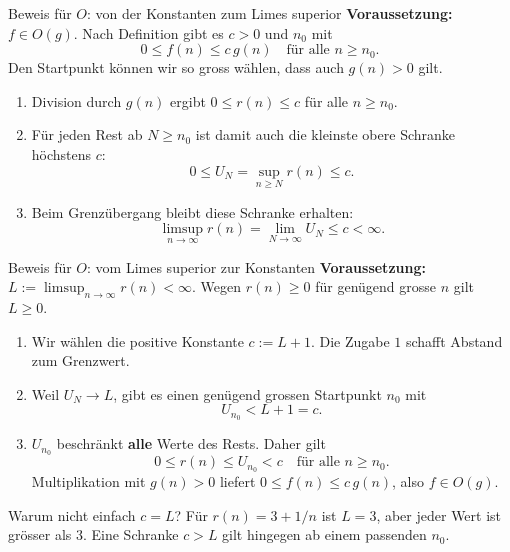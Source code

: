 \begin{frame}{Beweis für $O$: von der Konstanten zum Limes superior}
	\textbf{Voraussetzung:} $f\in O(g)$. Nach Definition gibt es $c>0$ und $n_0$ mit
	\[
		0\leq f(n)\leq c\,g(n)\quad\text{für alle }n\geq n_0.
	\]
	Den Startpunkt können wir so gross wählen, dass auch $g(n)>0$ gilt.
	\pause
	\begin{enumerate}
		\item Division durch $g(n)$ ergibt $0\leq r(n)\leq c$ für alle $n\geq n_0$.
		\item Für jeden Rest ab $N\geq n_0$ ist damit auch die kleinste obere Schranke höchstens $c$:
		\[
			0\leq U_N=\sup_{n\geq N}r(n)\leq c.
		\]
		\item Beim Grenzübergang bleibt diese Schranke erhalten:
		\[
			\limsup_{n\to\infty}r(n)=\lim_{N\to\infty}U_N\leq c<\infty.
		\]
	\end{enumerate}
\end{frame}

\begin{frame}{Beweis für $O$: vom Limes superior zur Konstanten}
	\textbf{Voraussetzung:} $L:=\limsup_{n\to\infty}r(n)<\infty$.
	Wegen $r(n)\geq 0$ für genügend grosse $n$ gilt $L\geq 0$.
	\pause
	\begin{enumerate}
		\item Wir wählen die positive Konstante $c:=L+1$. Die Zugabe $1$ schafft Abstand zum Grenzwert.
		\item Weil $U_N\to L$, gibt es einen genügend grossen Startpunkt $n_0$ mit
		\[
			U_{n_0}<L+1=c.
		\]
		\item $U_{n_0}$ beschränkt \textbf{alle} Werte des Rests. Daher gilt
		\[
			0\leq r(n)\leq U_{n_0}<c\quad\text{für alle }n\geq n_0.
		\]
		Multiplikation mit $g(n)>0$ liefert $0\leq f(n)\leq c\,g(n)$, also $f\in O(g)$.
	\end{enumerate}
	\begin{alertblock}{Warum nicht einfach $c=L$?}
		Für $r(n)=3+1/n$ ist $L=3$, aber jeder Wert ist grösser als $3$. Eine Schranke $c>L$ gilt hingegen ab einem passenden $n_0$.
	\end{alertblock}
\end{frame}

